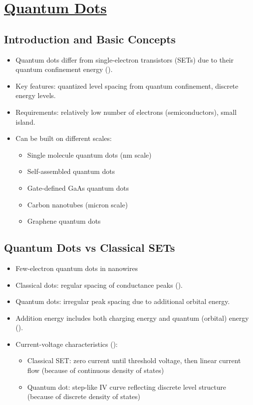 
\section[Quantum Dots]{\hyperlink{toc}{Quantum Dots}}

\subsection{Introduction and Basic Concepts}

\begin{itemize}
    \item Quantum dots differ from single-electron transistors (SETs) due to their quantum confinement energy ().
    \item Key features: quantized level spacing from quantum confinement, discrete energy levels.
    \item Requirements: relatively low number of electrons (semiconductors), small island.
    \item Can be built on different scales:
          \begin{itemize}
              \item Single molecule quantum dots (nm scale)
              \item Self-assembled quantum dots
              \item Gate-defined GaAs quantum dots
              \item Carbon nanotubes (micron scale)
              \item Graphene quantum dots
          \end{itemize}
\end{itemize}

\subsection{Quantum Dots vs Classical SETs}
\begin{itemize}
    \item Few-electron quantum dots in nanowires \parencite{Bjork2004}
    \item Classical dots: regular spacing of conductance peaks ().
    \item Quantum dots: irregular peak spacing due to additional orbital energy.
    \item Addition energy includes both charging energy and quantum (orbital) energy ().
    \item Current-voltage characteristics ():
          \begin{itemize}
              \item Classical SET: zero current until threshold voltage, then linear current flow (because of continuous density of states)
              \item Quantum dot: step-like IV curve reflecting discrete level structure (because of discrete density of states)
          \end{itemize}
\end{itemize}

